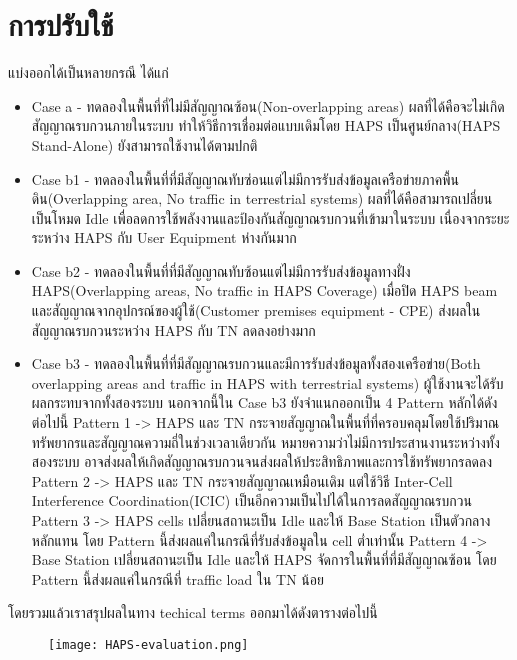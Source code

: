 \section{การปรับใช้}

แบ่งออกได้เป็นหลายกรณี ได้แก่

\begin{itemize}
    \item Case a - ทดลองในพื้นที่ที่ไม่มีสัญญาณซ้อน(Non-overlapping areas) ผลที่ได้คือจะไม่เกิดสัญญาณรบกวนภายในระบบ
            ทำให้วิธีการเชื่อมต่อแบบเดิมโดย HAPS เป็นศูนย์กลาง(HAPS Stand-Alone) ยังสามารถใช้งานได้ตามปกติ
    \item Case b1 - ทดลองในพื้นที่ที่มีสัญญาณทับซ่อนแต่ไม่มีการรับส่งข้อมูลเครือข่ายภาคพื้นดิน(Overlapping area, No traffic in terrestrial systems)
            ผลที่ได้คือสามารถเปลี่ยนเป็นโหมด Idle เพื่อลดการใช้พลังงานและป้องกันสัญญาณรบกวนที่เข้ามาในระบบ เนื่องจากระยะระหว่าง HAPS กับ User Equipment ห่างกันมาก
    \item Case b2 - ทดลองในพื้นที่ที่มีสัญญาณทับซ้อนแต่ไม่มีการรับส่งข้อมูลทางฝั่ง HAPS(Overlapping areas, No traffic in HAPS Coverage)
            เมื่อปิด HAPS beam และสัญญาณจากอุปกรณ์ของผู้ใช้(Customer premises equipment - CPE) ส่งผลในสัญญาณรบกวนระหว่าง HAPS กับ TN ลดลงอย่างมาก
    \item Case b3 - ทดลองในพื้นที่ที่มีสัญญาณรบกวนและมีการรับส่งข้อมูลทั้งสองเครือข่าย(Both overlapping areas and traffic in HAPS with terrestrial systems)
            ผู้ใช้งานจะได้รับผลกระทบจากทั้งสองระบบ นอกจากนี้ใน Case b3 ยังจำแนกออกเป็น 4 Pattern หลักได้ดังต่อไปนี้ 
            Pattern 1 -> HAPS และ TN กระจายสัญญาณในพื้นที่ที่ครอบคลุมโดยใช้ปริมาณทรัพยากรและสัญญาณความถี่ในช่วงเวลาเดียวกัน หมายความว่าไม่มีการประสานงานระหว่างทั้งสองระบบ 
                อาจส่งผลให้เกิดสัญญาณรบกวนจนส่งผลให้ประสิทธิภาพและการใช้ทรัพยากรลดลง
            Pattern 2 -> HAPS และ TN กระจายสัญญาณเหมือนเดิม แต่ใช้วิธี Inter-Cell Interference Coordination(ICIC) เป็นอีกความเป็นไปได้ในการลดสัญญาณรบกวน
            Pattern 3 -> HAPS cells เปลี่ยนสถานะเป็น Idle และให้ Base Station เป็นตัวกลางหลักแทน โดย Pattern นี้ส่งผลแค่ในกรณีที่รับส่งข้อมูลใน cell ต่ำเท่านั้น
            Pattern 4 -> Base Station เปลี่ยนสถานะเป็น Idle และให้ HAPS จัดการในพื้นที่ที่มีสัญญาณซ้อน โดย Pattern นี้ส่งผลแค่ในกรณีที่ traffic load ใน TN น้อย
\end{itemize}

โดยรวมแล้วเราสรุปผลในทาง techical terms ออกมาได้ดังตารางต่อไปนี้

\begin{figure}[h]
\centering    
\texttt{[image: HAPS-evaluation.png]}
\end{figure}
